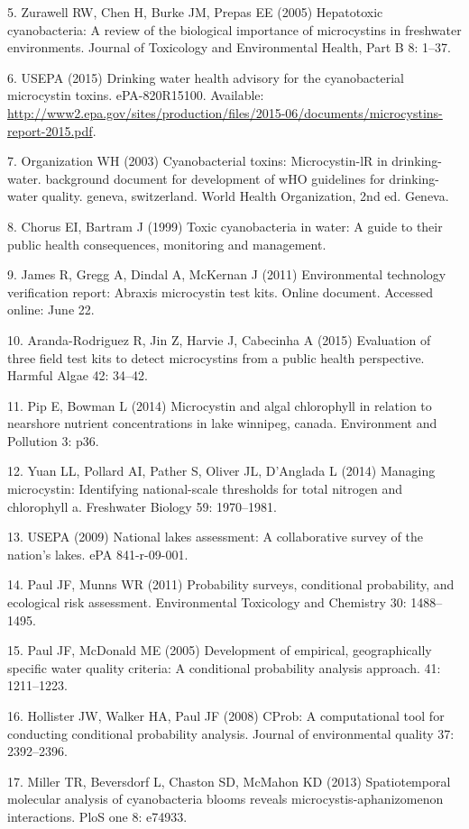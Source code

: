 \documentclass[10pt,a4paper,twocolumn]{article}
\begin{document}
5. Zurawell RW, Chen H, Burke JM, Prepas EE (2005) Hepatotoxic
cyanobacteria: A review of the biological importance of microcystins in
freshwater environments. Journal of Toxicology and Environmental Health,
Part B 8: 1--37.

6. USEPA (2015) Drinking water health advisory for the cyanobacterial
microcystin toxins. ePA-820R15100. Available:
\url{http://www2.epa.gov/sites/production/files/2015-06/documents/microcystins-report-2015.pdf}.

7. Organization WH (2003) Cyanobacterial toxins: Microcystin-lR in
drinking-water. background document for development of wHO guidelines
for drinking-water quality. geneva, switzerland. World Health
Organization, 2nd ed. Geneva.

8. Chorus EI, Bartram J (1999) Toxic cyanobacteria in water: A guide to
their public health consequences, monitoring and management.

9. James R, Gregg A, Dindal A, McKernan J (2011) Environmental
technology verification report: Abraxis microcystin test kits. Online
document. Accessed online: June 22.

10. Aranda-Rodriguez R, Jin Z, Harvie J, Cabecinha A (2015) Evaluation
of three field test kits to detect microcystins from a public health
perspective. Harmful Algae 42: 34--42.

11. Pip E, Bowman L (2014) Microcystin and algal chlorophyll in relation
to nearshore nutrient concentrations in lake winnipeg, canada.
Environment and Pollution 3: p36.

12. Yuan LL, Pollard AI, Pather S, Oliver JL, D'Anglada L (2014)
Managing microcystin: Identifying national-scale thresholds for total
nitrogen and chlorophyll a. Freshwater Biology 59: 1970--1981.

13. USEPA (2009) National lakes assessment: A collaborative survey of
the nation's lakes. ePA 841-r-09-001.

14. Paul JF, Munns WR (2011) Probability surveys, conditional
probability, and ecological risk assessment. Environmental Toxicology
and Chemistry 30: 1488--1495.

15. Paul JF, McDonald ME (2005) Development of empirical, geographically
specific water quality criteria: A conditional probability analysis
approach. 41: 1211--1223.

16. Hollister JW, Walker HA, Paul JF (2008) CProb: A computational tool
for conducting conditional probability analysis. Journal of
environmental quality 37: 2392--2396.

17. Miller TR, Beversdorf L, Chaston SD, McMahon KD (2013)
Spatiotemporal molecular analysis of cyanobacteria blooms reveals
microcystis-aphanizomenon interactions. PloS one 8: e74933.
\end{document}
